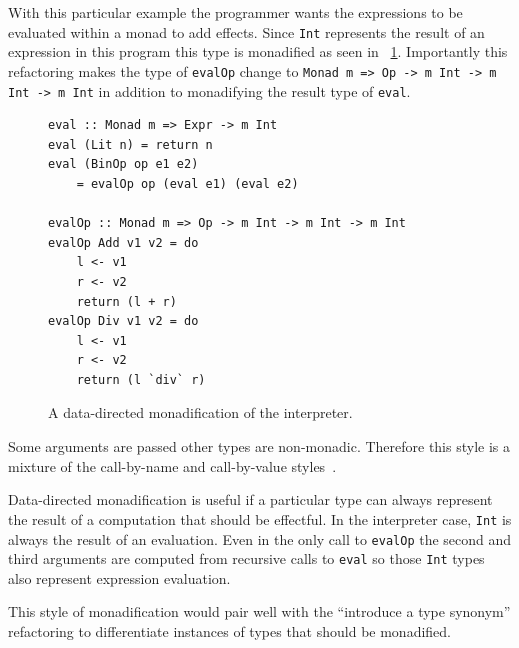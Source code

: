 With this particular example the programmer wants the expressions to be evaluated within a monad to add effects. Since \texttt{Int} represents the result of an expression in this program this type is monadified as seen in \DIFdelbegin {}\DIFdelend \DIFaddbegin {}\DIFaddend ~\ref{fig:monInterp}. Importantly this refactoring makes the type of \texttt{evalOp} change to \texttt{Monad m => Op -> m Int -> m Int -> m Int} in addition to monadifying the result type of \texttt{eval}. 

\begin{figure}[t]
\begin{lstlisting}
eval :: Monad m => Expr -> m Int
eval (Lit n) = return n
eval (BinOp op e1 e2)
	= evalOp op (eval e1) (eval e2)

evalOp :: Monad m => Op -> m Int -> m Int -> m Int
evalOp Add v1 v2 = do 
	l <- v1
	r <- v2	
	return (l + r)
evalOp Div v1 v2 = do
	l <- v1
	r <- v2
	return (l `div` r)
\end{lstlisting}
\caption{A data-directed monadification of the interpreter.}
\label{fig:monInterp}
\end{figure}

Some arguments are passed \DIFdelbegin {}\DIFdelend \DIFaddbegin {}\DIFaddend other types are non-monadic. Therefore this style is a mixture of the call-by-name and call-by-value styles~\citep{monadSurvey}. 

Data-directed monadification is useful if a particular type can always represent the result of a computation that should be effectful. \DIFaddbegin {}\DIFaddend In the interpreter case, \texttt{Int} is always the result of an evaluation. Even in the only call to \texttt{evalOp} the second and third arguments are computed from recursive calls to \texttt{eval} so those \texttt{Int} types also represent expression evaluation. \DIFdelbegin %

\DIFdelend This style of monadification would pair well with the ``introduce a type synonym'' refactoring to differentiate instances of types that should be monadified. 
\DIFdelbegin {}\texttt{} %
\DIFdelend 

